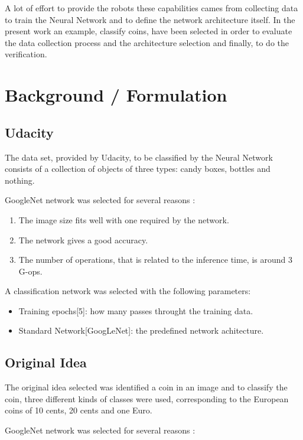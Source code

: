 \documentclass[10pt,journal,compsoc]{IEEEtran}
\begin{document}
A lot of effort to provide the robots these capabilities cames from collecting data to train the Neural Network and to define the network architecture itself. In the present work an example, classify coins, have been selected in order to evaluate the data collection process and the architecture selection and finally, to do the verification.
	
\section{Background / Formulation}

\subsection{Udacity}

The data set, provided by Udacity, to be classified by the Neural Network consists of a collection of objects of three types: candy boxes, bottles and nothing.

GoogleNet network was selected for several reasons \cite{analysisdnn}:

\begin{enumerate}
\item The image size fits well with one required by the network.
\item The network gives a good accuracy.
\item The number of operations, that is related to the inference time, is around 3 G-ops.
\end{enumerate}


A classification network was selected with the following parameters:

\begin{itemize}
	\item Training epochs[5]: how many passes throught the training data.
	\item Standard Network[GoogLeNet]: the predefined network achitecture.
\end{itemize}


\subsection{Original Idea}

The original idea selected was identified a coin in an image and to classify the coin, three different kinds of classes were used, corresponding to the European coins of 10 cents, 20 cents and one Euro.

GoogleNet network was selected for several reasons \cite{analysisdnn}:
\end{document}
